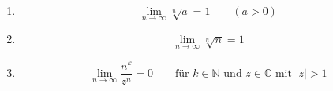 \begin{enumerate}
    \item $$\lim_{n \to \infty} \sqrt[n]{a} = 1 \qquad (a>0)$$
    \item $$\lim_{n \to \infty} \sqrt[n]{n} = 1$$
    \item $$\lim_{n \to \infty} \frac{n^k}{z^n} = 0 \qquad \text{für $k \in \mathbb{N}$ und $z \in \mathbb{C}$ mit $|z| > 1$}$$
\end{enumerate}